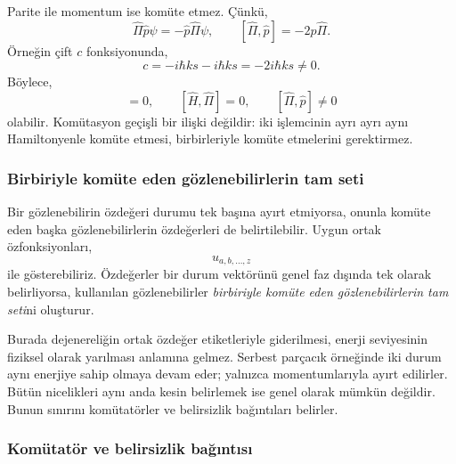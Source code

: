Parite ile momentum ise komüte etmez. Çünkü,
\begin{equation}
 \hat\Pi\hat p\psi=-\hat p\hat\Pi\psi,
 \qquad [\hat\Pi,\hat p]=-2\hat p\hat\Pi.
\end{equation}
Örneğin çift $c$ fonksiyonunda,
\begin{equation}
 [\hat\Pi,\hat p]c
 =-i\hbar k s-i\hbar k s=-2i\hbar k s\ne0.
\end{equation}
Böylece,
\begin{equation}
 [\hat H,\hat p]=0,\qquad [\hat H,\hat\Pi]=0,
 \qquad [\hat\Pi,\hat p]\ne0
 \label{eq:05_komutasyon_ornek}
\end{equation}
olabilir. Komütasyon geçişli bir ilişki değildir: iki işlemcinin
ayrı ayrı aynı Hamiltonyenle komüte etmesi, birbirleriyle komüte
etmelerini gerektirmez.

\subsubsection{Birbiriyle komüte eden gözlenebilirlerin tam seti}

Bir gözlenebilirin özdeğeri durumu tek başına ayırt etmiyorsa,
onunla komüte eden başka gözlenebilirlerin özdeğerleri de
belirtilebilir. Uygun ortak özfonksiyonları,
\begin{equation}
 u_{a,b,\ldots,z}
\end{equation}
ile gösterebiliriz. Özdeğerler bir durum vektörünü genel faz dışında
tek olarak belirliyorsa, kullanılan gözlenebilirler
\emph{birbiriyle komüte eden gözlenebilirlerin tam seti}ni oluşturur.

Burada dejenereliğin ortak özdeğer etiketleriyle giderilmesi,
enerji seviyesinin fiziksel olarak yarılması anlamına gelmez.
Serbest parçacık örneğinde iki durum aynı enerjiye sahip olmaya
devam eder; yalnızca momentumlarıyla ayırt edilirler. Bütün
nicelikleri aynı anda kesin belirlemek ise genel olarak mümkün
değildir. Bunun sınırını komütatörler ve belirsizlik bağıntıları
belirler.

\subsubsection{Komütatör ve belirsizlik bağıntısı}

